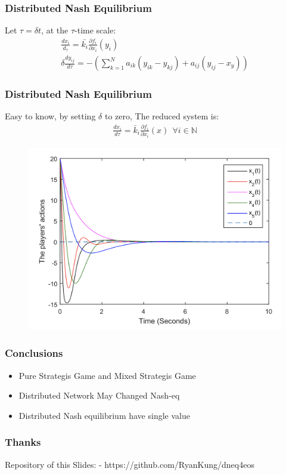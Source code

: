 \documentclass[notheorems, aspectratio=54]{beamer}
\begin{document}
\begin{frame}
  \frametitle{Distributed Nash Equilibrium}
  Let $\tau=\delta t$, at the $\tau$-time scale:\newline
  \begin{gather}
    \frac{dx_i}{d_{\tau}}=\bar{k_i}\frac{\partial f_i}{\partial x_i}(y_i)\nonumber\\
    \delta \frac{dy_{ij}}{d\tau}=-\left(\sum_{k=1}^N a_{ik}(y_{ik}-y_{kj})+a_{ij}(y_{ij}-x_y)\right) 
  \end{gather}
\end{frame}

\begin{frame}
  \frametitle{Distributed Nash Equilibrium}
  Easy to know, by setting $\delta$ to zero,  The reduced system is:
  \begin{gather}
    \frac{dx_i}{d\tau} = \bar{k}_i \frac{\partial f_i}{\partial x_i}(x) \ \  \forall i \in \mathbb{N}
  \end{gather}
  \begin{figure}[H]
    \centering
    \includegraphics[width=0.7\linewidth]{nash-eq.png}
  \end{figure}

\end{frame}


\begin{frame}
  \frametitle{Conclusions}
    \begin{itemize}
    \item Pure Strategis Game and Mixed Strategis Game
    \item Distributed Network May Changed Nash-eq
    \item Distributed Nash equilibrium have single value
    \end{itemize}
\end{frame}


\begin{frame}
  \frametitle{Thanks}
  Repository of this Slides:\newline
  - https://github.com/RyanKung/dneq4eos \quad
\end{frame}
\end{document}
